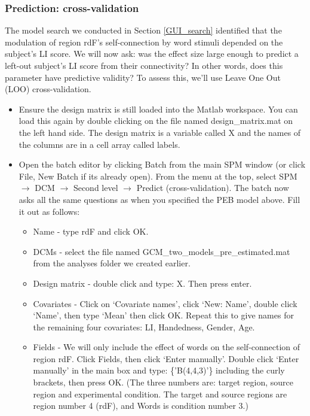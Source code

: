 \documentclass{article}
\begin{document}
\subsubsection{Prediction: cross-validation} \label{GUI_LOO}

The model search we conducted in Section \ref{GUI_search} identified that the modulation of region rdF's self-connection by word stimuli depended on the subject's LI score. We will now ask: was the effect size large enough to predict a left-out subject's LI score from their connectivity? In other words, does this parameter have predictive validity? To assess this, we'll use Leave One Out (LOO) cross-validation.

\begin{itemize}
    \item Ensure the design matrix is still loaded into the Matlab workspace. You can load this again by double clicking on the file named design\_matrix.mat on the left hand side. The design matrix is a variable called X and the names of the columns are in a cell array called labels.
    
    \item Open the batch editor by clicking Batch from the main SPM window (or click File, New Batch if its already open). From the menu at the top, select SPM $\rightarrow$ DCM $\rightarrow$ Second level $\rightarrow$ Predict (cross-validation). The batch now asks all the same questions as when you specified the PEB model above. Fill it out as follows:
    \begin{itemize}
        \item Name - type rdF and click OK.
        
        \item DCMs - select the file named GCM\_two\_models\_pre\_estimated.mat from the analyses folder we created earlier.
        
        \item Design matrix - double click and type: X. Then press enter.
        
        \item Covariates - Click on `Covariate names', click `New: Name', double click `Name', then type `Mean' then click OK.  Repeat this to give names for the remaining four covariates: LI, Handedness, Gender, Age.
        
        \item Fields - We will only include the effect of words on the self-connection of region rdF. Click Fields, then click `Enter manually'. Double click `Enter manually' in the main box and type: \{{'B(4,4,3)'}\} including the curly brackets, then press OK. (The three numbers are: target region, source region and experimental condition. The target and source regions are region number 4 (rdF), and Words is condition number 3.)
        

\end{itemize}
\end{itemize}
\end{document}
